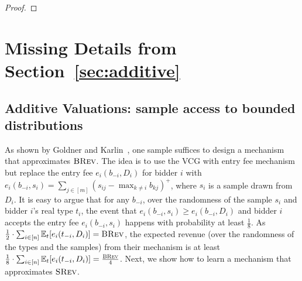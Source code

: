 \begin{proof}
\end{proof}

\section{Missing Details from Section~\ref{sec:additive}}
\subsection{Additive Valuations: sample access to bounded distributions}\label{sec:additive bounded}
As shown by Goldner and Karlin~\cite{GoldnerK16}, one sample suffices to design a mechanism that approximates $\textsc{BRev}$. The idea is to use the VCG with entry fee mechanism but replace the entry fee $e_i(b_{-i},D_i)$ for bidder $i$ with $e_i(b_{-i},s_i)=\sum_{j\in[m]}(s_{ij}-\max_{k\neq i} b_{kj})^+$, where $s_i$ is a sample drawn from $D_i$. It is easy to argue that for any $b_{-i}$, over the randomness of the sample $s_i$ and bidder $i$'s real type $t_i$, the event that $e_i(b_{-i},s_i)\geq e_i(b_{-i},D_i)$ and bidder $i$ accepts the entry fee $e_i(b_{-i},s_i)$ happens with probability at least $\frac{1}{8}$. As $\frac{1}{2}\cdot \sum_{i\in[n]} {\mathbb{E}}_{t}[e_i(t_{-i},D_i)]=\textsc{BRev}$, the expected revenue (over the randomness of the types and the samples) from their mechanism is at least $\frac{1}{8}\cdot \sum_{i\in[n]} {\mathbb{E}}_{t}[e_i(t_{-i},D_i)]=\frac{\textsc{BRev}}{4}$. Next, we show how to learn a mechanism that approximates $\textsc{SRev}$.

